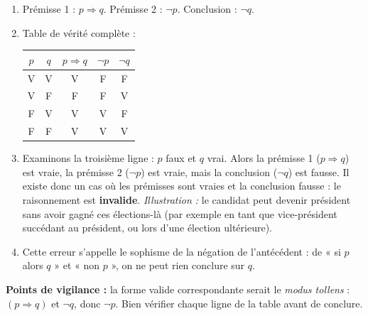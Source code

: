 \documentclass[11pt]{article}
\newcommand{\cle}[1]{{\popxbold\color{popdark}#1}}
\begin{document}
\begin{corrige}
\begin{enumerate}
\item Prémisse 1 : $p \Rightarrow q$. Prémisse 2 : $\neg p$. Conclusion : $\neg q$.
\item Table de vérité complète :
\begin{center}
\begin{tabular}{|c|c|c|c|c|}
\hline
\rowcolor{popblueL} $p$ & $q$ & $p \Rightarrow q$ & $\neg p$ & $\neg q$ \\
\hline
V & V & V & F & F \\
\hline
V & F & F & F & V \\
\hline
F & V & V & V & F \\
\hline
F & F & V & V & V \\
\hline
\end{tabular}
\end{center}
\item Examinons la troisième ligne : $p$ faux et $q$ vrai. Alors la prémisse 1 ($p \Rightarrow q$) est vraie, la prémisse 2 ($\neg p$) est vraie, mais la conclusion ($\neg q$) est fausse. Il existe donc un cas où les prémisses sont vraies et la conclusion fausse : le raisonnement est \textbf{invalide}. \emph{Illustration :} le candidat peut devenir président sans avoir gagné ces élections-là (par exemple en tant que vice-président succédant au président, ou lors d'une élection ultérieure).
\item Cette erreur s'appelle le \cle{sophisme de la négation de l'antécédent} : de « si $p$ alors $q$ » et « non $p$ », on ne peut rien conclure sur $q$.
\end{enumerate}
\textbf{Points de vigilance :} la forme valide correspondante serait le \emph{modus tollens} : $(p \Rightarrow q)$ et $\neg q$, donc $\neg p$. Bien vérifier chaque ligne de la table avant de conclure.
\end{corrige}
\end{document}
